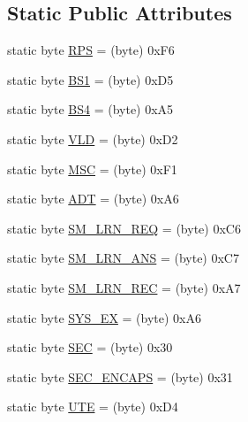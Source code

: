 \subsection*{Static Public Attributes}
\begin{DoxyCompactItemize}
\item 
static byte \hyperlink{classit_1_1polito_1_1elite_1_1enocean_1_1enj_1_1eep_1_1_rorg_ae9fc5bcaae65e470e1eb37d44523b5cd}{R\+PS} = (byte) 0x\+F6
\item 
static byte \hyperlink{classit_1_1polito_1_1elite_1_1enocean_1_1enj_1_1eep_1_1_rorg_a11b1c61c770a221b8d90c288463475bf}{B\+S1} = (byte) 0x\+D5
\item 
static byte \hyperlink{classit_1_1polito_1_1elite_1_1enocean_1_1enj_1_1eep_1_1_rorg_ac14afdcd628491797ead573f20959de6}{B\+S4} = (byte) 0x\+A5
\item 
static byte \hyperlink{classit_1_1polito_1_1elite_1_1enocean_1_1enj_1_1eep_1_1_rorg_acfca8d6e5fa8ff64e710bd720ee3e239}{V\+LD} = (byte) 0x\+D2
\item 
static byte \hyperlink{classit_1_1polito_1_1elite_1_1enocean_1_1enj_1_1eep_1_1_rorg_ab316f3e8c60b475c4dd25b05e853d82c}{M\+SC} = (byte) 0x\+F1
\item 
static byte \hyperlink{classit_1_1polito_1_1elite_1_1enocean_1_1enj_1_1eep_1_1_rorg_afd2d53a82ba5e01727766663ee756881}{A\+DT} = (byte) 0x\+A6
\item 
static byte \hyperlink{classit_1_1polito_1_1elite_1_1enocean_1_1enj_1_1eep_1_1_rorg_a67b87ec8e598ad7f364b5f77eab5bcd3}{S\+M\+\_\+\+L\+R\+N\+\_\+\+R\+EQ} = (byte) 0x\+C6
\item 
static byte \hyperlink{classit_1_1polito_1_1elite_1_1enocean_1_1enj_1_1eep_1_1_rorg_af978c4ce9f008fffed00a16819f6d695}{S\+M\+\_\+\+L\+R\+N\+\_\+\+A\+NS} = (byte) 0x\+C7
\item 
static byte \hyperlink{classit_1_1polito_1_1elite_1_1enocean_1_1enj_1_1eep_1_1_rorg_a76bd10bca89fb29c93097789e7825297}{S\+M\+\_\+\+L\+R\+N\+\_\+\+R\+EC} = (byte) 0x\+A7
\item 
static byte \hyperlink{classit_1_1polito_1_1elite_1_1enocean_1_1enj_1_1eep_1_1_rorg_a979f2cecfdfd52af42a32a210e317d25}{S\+Y\+S\+\_\+\+EX} = (byte) 0x\+A6
\item 
static byte \hyperlink{classit_1_1polito_1_1elite_1_1enocean_1_1enj_1_1eep_1_1_rorg_a826a8dbd1d36af90d2630cc7e6c56482}{S\+EC} = (byte) 0x30
\item 
static byte \hyperlink{classit_1_1polito_1_1elite_1_1enocean_1_1enj_1_1eep_1_1_rorg_abee181aad3432816d36d20aebc662db7}{S\+E\+C\+\_\+\+E\+N\+C\+A\+PS} = (byte) 0x31
\item 
static byte \hyperlink{classit_1_1polito_1_1elite_1_1enocean_1_1enj_1_1eep_1_1_rorg_a73378d33c207ee3f1979326ab395078d}{U\+TE} = (byte) 0x\+D4
\end{DoxyCompactItemize}


